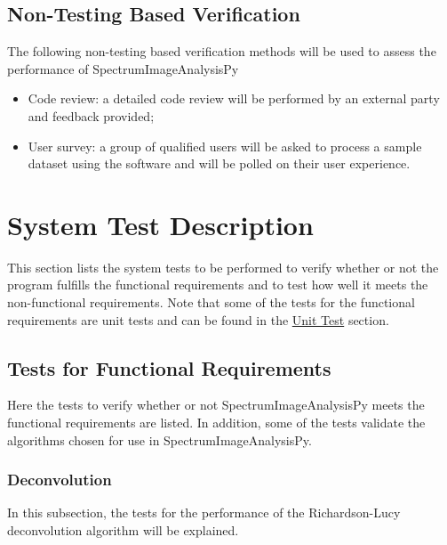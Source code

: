 \documentclass[12pt, titlepage]{article}
\newcommand{\progname}{SpectrumImageAnalysisPy}
\begin{document}
\subsection{Non-Testing Based Verification}

The following non-testing based verification methods will be used to assess the performance of \progname{}

\begin{itemize}
	\item Code review: a detailed code review will be performed by an external party and feedback provided;
	\item User survey: a group of qualified users will be asked to process a sample dataset using the software and will be polled on their user experience.
\end{itemize}

\section{System Test Description}
\label{sec:SysTest}
This section lists the system tests to be performed to verify whether or not the program fulfills the functional requirements and to test how well it meets the non-functional requirements. Note that some of the tests for the functional requirements are unit tests and can be found in the \hyperref[sec:UnitTest]{Unit Test} section.

\subsection{Tests for Functional Requirements}
\label{subsec:FuncReqTest}
Here the tests to verify whether or not \progname{} meets the functional requirements are listed. In addition, some of the tests validate the algorithms chosen for use in \progname{}.

\subsubsection{Deconvolution}
In this subsection, the tests for the performance of the Richardson-Lucy deconvolution algorithm will be explained.
\paragraph{}
\end{document}

